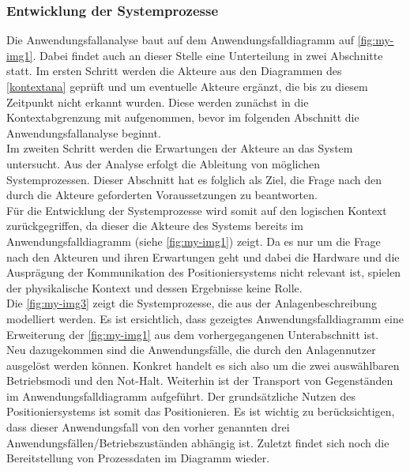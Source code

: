 \documentclass[../../../Bachelorarbeit.tex]{subfiles}
\begin{document}
\subsubsection{Entwicklung der Systemprozesse}
Die Anwendungsfallanalyse baut auf dem Anwendungsfalldiagramm auf \autoref{fig:my-img1}. Dabei findet auch an dieser Stelle eine Unterteilung in zwei Abschnitte statt. Im ersten Schritt werden die Akteure aus den Diagrammen des \autoref{kontextana} geprüft und um eventuelle Akteure ergänzt, die bis zu diesem Zeitpunkt nicht erkannt wurden. Diese werden zunächst in die Kontextabgrenzung mit aufgenommen, bevor im folgenden Abschnitt die Anwendungsfallanalyse beginnt.\\
Im zweiten Schritt werden die Erwartungen der Akteure an das System untersucht. Aus der Analyse erfolgt die Ableitung von möglichen Systemprozessen. Dieser Abschnitt hat es folglich als Ziel, die Frage nach den durch die Akteure geforderten Voraussetzungen zu beantworten.\\
Für die Entwicklung der Systemprozesse wird somit auf den logischen Kontext zurückgegriffen, da dieser die Akteure des Systems bereits im Anwendungsfalldiagramm (siehe \autoref{fig:my-img1}) zeigt. Da es nur um die Frage nach den Akteuren und ihren Erwartungen geht und dabei die Hardware und die Ausprägung der Kommunikation des Positioniersystems nicht relevant ist, spielen der physikalische Kontext und dessen Ergebnisse keine Rolle.\\
Die \autoref{fig:my-img3} zeigt die Systemprozesse, die aus der Anlagenbeschreibung modelliert werden. Es ist ersichtlich, dass gezeigtes Anwendungsfalldiagramm eine Erweiterung der \autoref{fig:my-img1} aus dem vorhergegangenen Unterabschnitt ist.\\
Neu dazugekommen sind die Anwendungsfälle, die durch den Anlagennutzer ausgelöst werden können. Konkret handelt es sich also um die zwei auswählbaren Betriebsmodi und den Not-Halt. Weiterhin ist der Transport von Gegenständen im Anwendungsfalldiagramm aufgeführt. Der grundsätzliche Nutzen des Positioniersystems ist somit das Positionieren. Es ist wichtig zu berücksichtigen, dass dieser Anwendungsfall von den vorher genannten drei Anwendungsfällen/Betriebszuständen abhängig ist. Zuletzt findet sich noch die Bereitstellung von Prozessdaten im Diagramm wieder.
\end{document}
